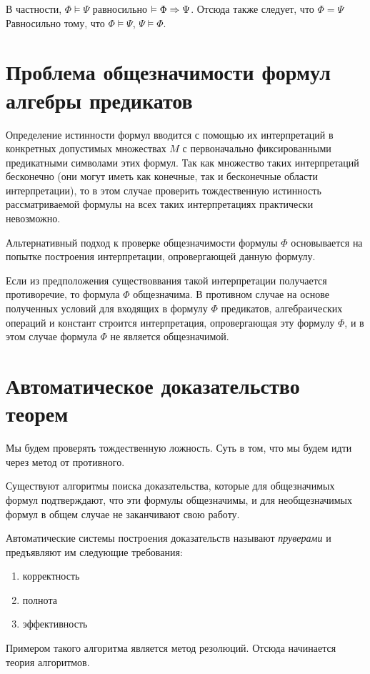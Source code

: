 В частности, $\Phi \vDash \Psi$ равносильно $\vDash \Phi \Rightarrow \Psi$. Отсюда также следует, что $\Phi = \Psi$ Равносильно тому, что $\Phi \vDash \Psi$, $\Psi \vDash \Phi$.

\section{Проблема общезначимости формул алгебры предикатов}
Определение истинности формул вводится с помощью их интерпретаций в конкретных допустимых множествах $M$ с первоначально фиксированными предикатными символами этих формул. Так как множество таких интерпретаций бесконечно (они могут иметь как конечные, так и бесконечные области интерпретации), то в этом случае проверить тождественную истинность рассматриваемой формулы на всех таких интерпретациях практически невозможно.

Альтернативный подход к проверке общезначимости формулы $\Phi$ основывается на попытке построения интерпретации, опровергающей данную формулу.

Если из предположения существоввания такой интерпретации получается противоречие, то формула $\Phi$ общезначима. В противном случае на основе полученных условий для входящих в формулу $\Phi$ предикатов, алгебраических операций и констант строится интерпретация, опровергающая эту формулу $\Phi$, и в этом случае формула $\Phi$ не является общезначимой.

\section{Автоматическое доказательство теорем}
Мы будем проверять тождественную ложность. Суть в том, что мы будем идти через метод от противного.

Существуют алгоритмы поиска доказательства, которые для общезначимых формул подтверждают, что эти формулы общезначимы, и для необщезначимых формул в общем случае не заканчивают свою работу.

Автоматические системы построения доказательств называют {\it пруверами} и предъявляют им следующие требования:
\begin{enumerate}
    \item корректность
    \item полнота 
    \item эффективность
\end{enumerate}

Примером такого алгоритма является метод резолюций. Отсюда начинается теория алгоритмов.

